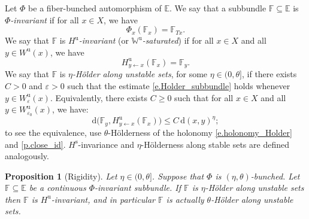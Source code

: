 \documentclass[JEP,XML,SOM,Unicode]{cedram}
\theoremstyle{plain}
\newtheorem{proposition}[theorem]{Proposition}
\theoremstyle{definition}
\newcommand{\EE}{\mathbb{E}}
\newcommand{\FF}{\mathbb{F}}
\newcommand{\WW}{\mathbb{W}}
\newcommand{\dd}{\mathrm{d}}
\newcommand{\uu}{\mathrm{u}}
\renewcommand{\ss}{\mathrm{s}}
\let\epsilon\varepsilon
\begin{document}
Let $\Phi$ be a fiber-bunched automorphism of $\EE$.
We say that a subbundle $\FF \subseteq \EE$ is \emph{$\Phi$-invariant} if for all $x \in X$, we have
\[
\Phi_x (\FF_x) = \FF_{Tx}.
\]
We say that $\FF$ is \emph{$H^\uu$-invariant} (or \emph{$\WW^\uu$-saturated})
if for all $x \in X$ and all $y \in W^\uu(x)$, we have
\[
H_{y \gets x}^\uu (\FF_x) = \FF_y.
\]
We say that $\FF$ is \emph{$\eta$-Hölder along unstable sets}, for some $\eta \in (0,\theta]$, if
there exists $C>0$ and $\epsilon>0$ such that the estimate \eqref{e.Holder_subbundle} holds whenever $y \in W^\uu_{\epsilon}(x)$.
Equivalently,
there exists $C \ge 0$ such that for all $x \in X$ and all $y \in W^\uu_{\epsilon_0}(x)$, we have:
\begin{equation}\label{e.Holder_section}
\dd \big( \FF_y, H^\uu_{y \gets x} (\FF_x) \big) \le C \, \dd(x,y)^{\eta} ;
\end{equation}
to see the equivalence, use $\theta$-Hölderness of the holonomy \eqref{e.holonomy_Holder} and \cref{p.close_id}.
$H^\ss$-invariance and $\eta$-Hölderness along stable sets are defined analogously.

\begin{proposition}[Rigidity] \label{p.rigidity}
Let $\eta \in (0,\theta]$.
Suppose that $\Phi$ is $(\eta,\theta)$-bunched.
Let $\FF \subseteq \EE$ be a continuous $\Phi$-invariant subbundle.
If $\FF$ is $\eta$-Hölder along unstable sets then
$\FF$ is $H^\uu$-invariant, and in particular
$\FF$ is actually $\theta$-Hölder along unstable sets.
\end{proposition}
\end{document}
